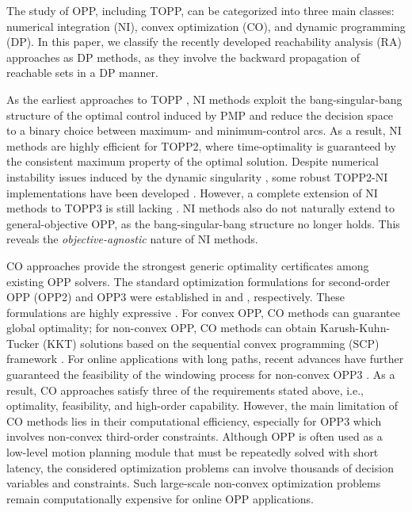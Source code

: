 \documentclass[journal]{IEEEtran}
\theoremstyle{definition}
\theoremstyle{definition}
\begin{document}
The study of OPP, including TOPP, can be categorized into three main classes: numerical integration (NI), convex optimization (CO), and dynamic programming (DP). In this paper, we classify the recently developed reachability analysis (RA) approaches as DP methods, as they involve the backward propagation of reachable sets in a DP manner.

As the earliest approaches to TOPP \cite{shin1985minimum}, NI methods exploit the bang-singular-bang structure of the optimal control induced by PMP and reduce the decision space to a binary choice between maximum- and minimum-control arcs. As a result, NI methods are highly efficient for TOPP2, where time-optimality is guaranteed by the consistent maximum property of the optimal solution. Despite numerical instability issues induced by the dynamic singularity \cite{shiller1992computation}, some robust TOPP2-NI implementations have been developed \cite{pham2014general}. However, a complete extension of NI methods to TOPP3 is still lacking \cite{pham2017structure}. NI methods also do not naturally extend to general-objective OPP, as the bang-singular-bang structure no longer holds. This reveals the \textit{objective-agnostic} nature of NI methods.

CO approaches provide the strongest generic optimality certificates among existing OPP solvers. The standard optimization formulations for second-order OPP (OPP2) and OPP3 were established in \cite{verscheure2009time} and \cite{debrouwere2013time}, respectively. These formulations are highly expressive \cite{hauser2014fast}. For convex OPP, CO methods can guarantee global optimality; for non-convex OPP, CO methods can obtain Karush-Kuhn-Tucker (KKT) solutions based on the sequential convex programming (SCP) framework \cite{le2018dc}. For online applications with long paths, recent advances have further guaranteed the feasibility of the windowing process for non-convex OPP3 \cite{wang2026online}. As a result, CO approaches satisfy three of the requirements stated above, i.e., optimality, feasibility, and high-order capability. However, the main limitation of CO methods lies in their computational efficiency, especially for OPP3 which involves non-convex third-order constraints. Although OPP is often used as a low-level motion planning module that must be repeatedly solved with short latency, the considered optimization problems can involve thousands of decision variables and constraints. Such large-scale non-convex optimization problems remain computationally expensive for online OPP applications.
\end{document}
